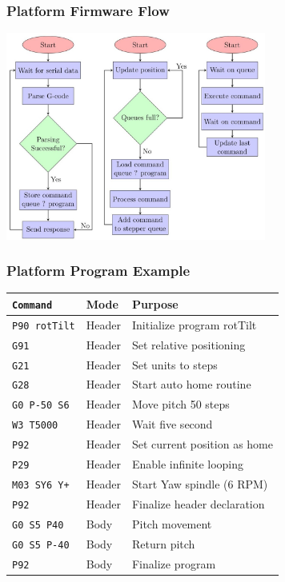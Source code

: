 \documentclass[aspectratio=169]{beamer}
\begin{document}
\begin{frame}[fragile]
  \frametitle{Platform Firmware Flow}

  \centering
  \includegraphics[width=0.64\textwidth]{../img/platform_flow.jpg}

\end{frame}

\begin{frame}[fragile]
  \frametitle{Platform Program Example}
  \begin{tabular}{lll}
    \hline
    \texttt{Command}     & Mode   & Purpose                      \\
    \hline
    \texttt{P90 rotTilt} & Header & Initialize program rotTilt   \\
    \texttt{G91}         & Header & Set relative positioning     \\
    \texttt{G21}         & Header & Set units to steps           \\
    \texttt{G28}         & Header & Start auto home routine      \\
    \texttt{G0 P-50 S6}  & Header & Move pitch 50 steps          \\
    \texttt{W3 T5000}    & Header & Wait five second             \\
    \texttt{P92}         & Header & Set current position as home \\
    \texttt{P29}         & Header & Enable infinite looping      \\
    \texttt{M03 SY6 Y+}  & Header & Start Yaw spindle (6 RPM)    \\
    \texttt{P92}         & Header & Finalize header declaration  \\
    \texttt{G0 S5 P40}   & Body   & Pitch movement               \\
    \texttt{G0 S5 P-40}  & Body   & Return pitch                 \\
    \texttt{P92}         & Body   & Finalize program             \\
    \hline
  \end{tabular}
\end{frame}
\end{document}
